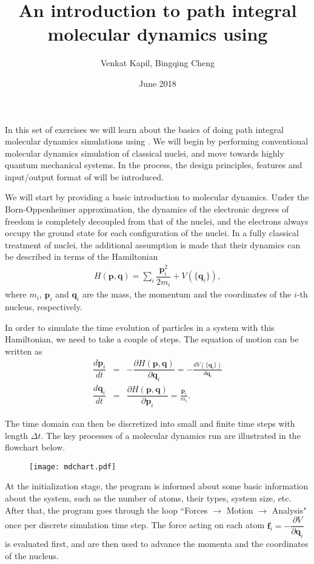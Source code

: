 \documentclass{article}
\title{An introduction to path integral \\molecular dynamics using \ipi{}}
\author{Venkat Kapil, Bingqing Cheng}
\date{June 2018}
\begin{document}
\maketitle

In this set of exercises we will learn 
about the basics of doing path integral 
molecular dynamics simulations using \ipi{}. 
We will begin by performing conventional
molecular dynamics simulation of classical nuclei,
and move towards highly quantum mechanical systems.
In the process, the design principles, 
features and input/output format of \ipi{} 
will be introduced.

\begin{Exercise}[label={i-pi},title={Molecular Dynamics: a client/server approach}]

We will start by providing a basic introduction to molecular dynamics.
Under the Born-Oppenheimer
approximation, the dynamics of the electronic
degrees of freedom is completely decoupled from that of the nuclei, and the electrons always
occupy the ground state for each configuration of the nuclei. 
In a fully classical treatment of nuclei, the
additional assumption is made that their 
dynamics can be described in terms of the 
Hamiltonian
\begin{eqnarray}
    H(\textbf{p},\textbf{q})=\sum_i \dfrac{\textbf{p}_i^2}{2 m_i} + V(\{\textbf{q}_i\}),
\end{eqnarray}
where $m_i$, $\textbf{p}_i$ and $\textbf{q}_i$ 
are the mass, the momentum and the coordinates of the $i$-th nucleus, respectively.

In order to simulate the time evolution of particles in a system
with this Hamiltonian, we need to take a couple of steps.
The equation of motion can be written as
\begin{eqnarray}
   \dfrac{d \textbf{p}_i}{d t}&=& 
   - \dfrac{\partial H(\textbf{p},\textbf{q})}{\partial \textbf{q}_i}=-\frac{d V(\{\textbf{q}_i\})}{d\textbf{q}_i} \\
   \dfrac{d \textbf{q}_i}{d t}&=& 
   \dfrac{\partial H(\textbf{p},\textbf{q})}{\partial \textbf{p}_i} = \frac{\textbf{p}_i}{m_i}.
\end{eqnarray}

The time domain can then be discretized into small  and finite time steps with length $\Delta t$.
The key processes of a molecular dynamics run are illustrated in the flowchart below.
\begin{figure}[h]
    \begin{center}
    \texttt{[image: mdchart.pdf]}
    \end{center}
\end{figure}
At the initialization stage, the program is informed about some basic information about the system,
such as the number of atoms, their types, system size, etc.
After that, the program goes through the loop ``Forces $\rightarrow$ Motion $\rightarrow$ Analysis" once per discrete simulation time step.
The force acting on each atom $\textbf{f}_i=-\dfrac{\partial V}{\partial \textbf{q}_i}$ is evaluated first,
and are then used to advance the momenta and the coordinates of the nucleus. 


\end{Exercise}
\end{document}
